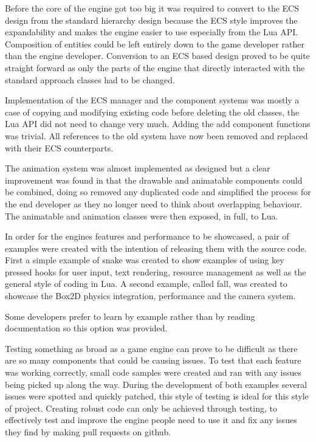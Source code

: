 \documentclass[11pt,a4paper,titlepage]{report}
\begin{document}
	
	Before the core of the engine got too big it was required to convert to the ECS design from the standard hierarchy design because the ECS style improves the expandability and makes the engine easier to use especially from the Lua API. Composition of entities could be left entirely down to the game developer rather than the engine developer. Conversion to an ECS based design proved to be quite straight forward as only the parts of the engine that directly interacted with the standard approach classes had to be changed.

	Implementation of the ECS manager and the component systems was mostly a case of copying and modifying existing code before deleting the old classes, the Lua API did not need to change very much. Adding the add component functions was trivial. All references to the old system have now been removed and replaced with their ECS counterparts.


	The animation system was almost implemented as designed but a clear improvement was found in that the drawable and animatable components could be combined, doing so removed any duplicated code and simplified the process for the end developer as they no longer need to think about overlapping behaviour. The animatable and animation classes were then exposed, in full, to Lua.


	In order for the engines features and performance to be showcased, a pair of examples were created with the intention of releasing them with the source code. First a simple example of snake was created to show examples of using key pressed hooks for user input, text rendering, resource management as well as the general style of coding in Lua. A second example, called fall, was created to showcase the Box2D physics integration, performance and the camera system.

	Some developers prefer to learn by example rather than by reading documentation so this option was provided.





	Testing something as broad as a game engine can prove to be difficult as there are so many components that could be causing issues. To test that each feature was working correctly, small code samples were created and ran with any issues being picked up along the way. During the development of both examples several issues were spotted and quickly patched, this style of testing is ideal for this style of project. Creating robust code can only be achieved through testing, to effectively test and improve the engine people need to use it and fix any issues they find by making pull requests on github.
\end{document}
